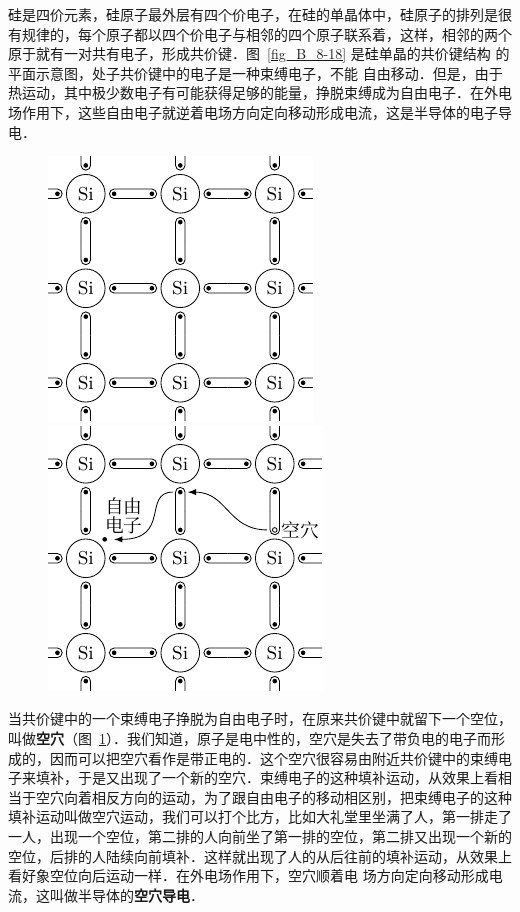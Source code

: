 硅是四价元素，硅原子最外层有四个价电子，在硅的单晶体中，硅原子的排列是很有规律的，每个原子都以四个价电子与相邻的四个原子联系着，这样，相邻的两个原于就有一对共有电子，形成共价键．图~\ref{fig_B_8-18} 是硅单晶的共价键结构
的平面示意图，处子共价键中的电子是一种束缚电子，不能
自由移动．但是，由于热运动，其中极少数电子有可能获得足够的能量，挣脱束缚成为自由电子．在外电场作用下，这些自由电子就逆着电场方向定向移动形成电流，这是半导体的电子导电．
\begin{figure}[htbp]
    \centering
    \begin{minipage}[t]{0.48\textwidth}
        \centering
        \includegraphics{fig/B/8-18.pdf}
        \caption{}\label{fig_B_8-18}
    \end{minipage}
    \begin{minipage}[t]{0.48\textwidth}
        \centering
        \includegraphics{fig/B/8-19.pdf}
        \caption{}\label{fig_B_8-19}
    \end{minipage}
\end{figure}

当共价键中的一个束缚电子挣脱为自由电子时，在原来共价键中就留下一个空位，叫做\textbf{空穴}（图~\ref{fig_B_8-19}）．我们知道，原子是电中性的，空穴是失去了带负电的电子而形成的，因而可以把空穴看作是带正电的．这个空穴很容易由附近共价键中的束缚电子来填补，于是又出现了一个新的空穴．束缚电子的这种填补运动，从效果上看相当于空穴向着相反方向的运动，为了跟自由电子的移动相区别，把束缚电子的这种填补运动叫做空穴运动，我们可以打个比方，比如大礼堂里坐满了人，第一排走了一人，出现一个空位，第二排的人向前坐了第一排的空位，第二排又出现一个新的空位，后排的人陆续向前填补．这样就出现了人的从后往前的填补运动，从效果上看好象空位向后运动一样．在外电场作用下，空穴顺着电
场方向定向移动形成电流，这叫做半导体的\textbf{空穴导电}．


